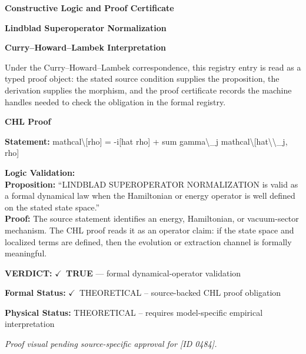\clearpage
\begingroup\tzpsupportsetup
\noindent\textbf{\fontsize{10.8pt}{12.8pt}\selectfont [ID 0484] Constructive Logic and Proof Certificate}\par
\noindent\textbf{\fontsize{10pt}{12pt}\selectfont Lindblad Superoperator Normalization}\par
\vspace{0.45em}
\begingroup
\footnotesize
\setlength{\parskip}{0.22em}
\setlength{\parindent}{0pt}
\noindent\textbf{Curry--Howard--Lambek Interpretation}\par
Under the Curry--Howard--Lambek correspondence, this registry entry is read as a typed proof
object: the stated source condition supplies the proposition, the derivation supplies the
morphism, and the proof certificate records the machine handles needed to check the obligation
in the formal registry.

\vspace{0.45em}
\noindent\textbf{CHL Proof}\par
\textbf{Statement:} mathcal\textbackslash{}[rho] = -i[hat rho] + sum gamma\textbackslash{}\_j mathcal\textbackslash{}[hat\textbackslash{}\textbackslash{}\_j, rho]

\textbf{Logic Validation:}\\
\textbf{Proposition:} ``LINDBLAD SUPEROPERATOR NORMALIZATION is valid as a formal dynamical law when the
Hamiltonian or energy operator is well defined on the stated state space.''\\
\textbf{Proof:} The source statement identifies an energy, Hamiltonian, or vacuum-sector mechanism. The
CHL proof reads it as an operator claim: if the state space and localized terms are
defined, then the evolution or extraction channel is formally meaningful.

\textbf{VERDICT:} \ensuremath{\checkmark}\ \textbf{TRUE} --- formal dynamical-operator validation

\textbf{Formal Status:} \ensuremath{\checkmark}\ THEORETICAL -- source-backed CHL proof obligation

\textbf{Physical Status:} THEORETICAL -- requires model-specific empirical interpretation
\par\vspace{0.45em}
\par
\vfill
\begingroup\footnotesize\itshape
Proof visual pending source-specific approval for [ID 0484].
\par\endgroup
\vfill
\endgroup
\endgroup
